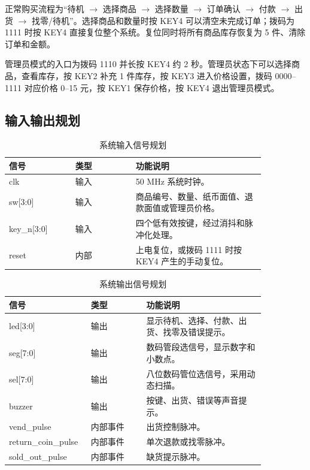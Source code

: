 \documentclass[UTF8,a4paper,12pt]{ctexart}
\begin{document}
正常购买流程为“待机 $\rightarrow$ 选择商品 $\rightarrow$ 选择数量 $\rightarrow$ 订单确认 $\rightarrow$ 付款 $\rightarrow$ 出货 $\rightarrow$ 找零/待机”。选择商品和数量时按 KEY4 可以清空未完成订单；拨码为 1111 时按 KEY4 直接复位整个系统。复位同时将所有商品库存恢复为 5 件、清除订单和金额。

管理员模式的入口为拨码 1110 并长按 KEY4 约 2 秒。管理员状态下可以选择商品，查看库存，按 KEY2 补充 1 件库存，按 KEY3 进入价格设置，拨码 0000--1111 对应价格 0--15 元，按 KEY1 保存价格，按 KEY4 退出管理员模式。

\subsection{输入输出规划}

\begin{table}[H]
\centering
\caption{系统输入信号规划}
\label{tab:inputs}
\begin{tabular}{>{\centering\arraybackslash}p{0.22\linewidth}p{0.2\linewidth}p{0.43\linewidth}}
\toprule
信号 & 类型 & 功能说明 \\
\midrule
clk & 输入 & 50 MHz 系统时钟。 \\
sw[3:0] & 输入 & 商品编号、数量、纸币面值、退款面值或管理员价格。 \\
key\_n[3:0] & 输入 & 四个低有效按键，经过消抖和脉冲化处理。 \\
reset & 内部 & 上电复位，或拨码 1111 时按 KEY4 产生的手动复位。 \\
\bottomrule
\end{tabular}
\end{table}

\begin{table}[H]
\centering
\caption{系统输出信号规划}
\label{tab:outputs}
\begin{tabular}{>{\centering\arraybackslash}p{0.22\linewidth}p{0.2\linewidth}p{0.43\linewidth}}
\toprule
信号 & 类型 & 功能说明 \\
\midrule
led[3:0] & 输出 & 显示待机、选择、付款、出货、找零及错误提示。 \\
seg[7:0] & 输出 & 数码管段选信号，显示数字和小数点。 \\
sel[7:0] & 输出 & 八位数码管位选信号，采用动态扫描。 \\
buzzer & 输出 & 按键、出货、错误等声音提示。 \\
vend\_pulse & 内部事件 & 出货控制脉冲。 \\
return\_coin\_pulse & 内部事件 & 单次退款或找零脉冲。 \\
sold\_out\_pulse & 内部事件 & 缺货提示脉冲。 \\
\bottomrule
\end{tabular}
\end{table}
\end{document}
